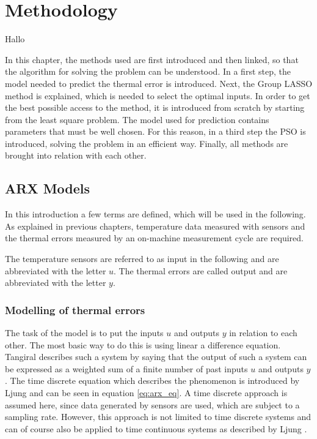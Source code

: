 \chapter{Methodology}
\label{chp:sample_chapter}

Hallo

In this chapter, the methods used are first introduced and then linked, so that the algorithm for solving the problem can be understood. In a first step, the model needed to predict the thermal error is introduced. Next, the Group LASSO method is explained, which is needed to select the optimal inputs.  In order to get the best possible access to the method, it is introduced from scratch by starting from the least square problem.  
The model used for prediction contains parameters that must be well chosen. For this reason, in a third step the PSO is introduced, solving the problem in an efficient way. Finally, all methods are brought into relation with each other.



\section{ARX Models}
\label{sec:ARX_models}


In this introduction a few terms are defined, which will be used in the following. As explained in previous chapters, temperature data measured with sensors and the thermal errors measured by an on-machine measurement cycle are required.

The temperature sensors are referred to as input in the following and are abbreviated with the letter $u$. The thermal errors are called output and are abbreviated with the letter $y$. 

\subsection{Modelling of thermal errors}
\label{sec:modelling of errors}

The task of the model is to put the inputs $u$ and outputs $y$ in relation to each other. The most basic way to do this is using linear a difference equation. Tangiral \cite{Tangiral_2014} describes such a system by saying that the output of such a system can be expressed as a weighted sum of a finite number of past inputs $u$ and outputs $y$. The time discrete equation which describes the phenomenon is introduced by Ljung \cite{Ljung_1999} and can be seen in equation \ref{eq:arx_eq}. A time discrete approach is assumed here, since data generated by sensors are used, which are subject to a sampling rate. However, this approach is not limited to time discrete systems and can of course also be applied to time continuous systems as described by Ljung \cite{Ljung_1999}.


